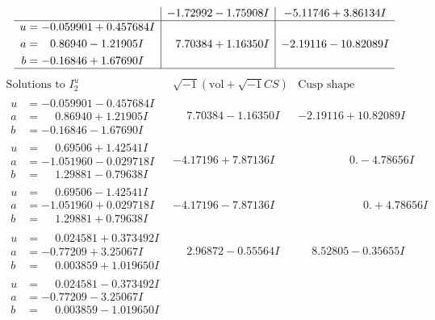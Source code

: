 \documentclass[1p]{elsarticle_modified}
\theoremstyle{definition}
\newcommand{\I}{\sqrt{-1}}
\begin{document}
$$\begin{array}{c|c|c}
 & -1.72992 - 1.75908 I & -5.11746 + 3.86134 I \\ \hline\begin{aligned}
u &= -0.059901 + 0.457684 I \\
a &= \phantom{-}0.86940 - 1.21905 I \\
b &= -0.16846 + 1.67690 I\end{aligned}
 & \phantom{-}7.70384 + 1.16350 I & -2.19116 - 10.82089 I\\
 \hline 
 \end{array}$$\newpage$$\begin{array}{c|c|c}  
\text{Solutions to }I^u_{2}& \I (\text{vol} + \sqrt{-1}CS) & \text{Cusp shape}\\
 \hline 
\begin{aligned}
u &= -0.059901 - 0.457684 I \\
a &= \phantom{-}0.86940 + 1.21905 I \\
b &= -0.16846 - 1.67690 I\end{aligned}
 & \phantom{-}7.70384 - 1.16350 I & -2.19116 + 10.82089 I \\ \hline\begin{aligned}
u &= \phantom{-}0.69506 + 1.42541 I \\
a &= -1.051960 - 0.029718 I \\
b &= \phantom{-}1.29881 - 0.79638 I\end{aligned}
 & -4.17196 + 7.87136 I & \phantom{-0.000000 } 0. - 4.78656 I \\ \hline\begin{aligned}
u &= \phantom{-}0.69506 - 1.42541 I \\
a &= -1.051960 + 0.029718 I \\
b &= \phantom{-}1.29881 + 0.79638 I\end{aligned}
 & -4.17196 - 7.87136 I & \phantom{-0.000000 -}0. + 4.78656 I \\ \hline\begin{aligned}
u &= \phantom{-}0.024581 + 0.373492 I \\
a &= -0.77209 + 3.25067 I \\
b &= \phantom{-}0.003859 + 1.019650 I\end{aligned}
 & \phantom{-}2.96872 - 0.55564 I & \phantom{-}8.52805 - 0.35655 I \\ \hline\begin{aligned}
u &= \phantom{-}0.024581 - 0.373492 I \\
a &= -0.77209 - 3.25067 I \\
b &= \phantom{-}0.003859 - 1.019650 I\end{aligned}

\end{array}$$
\end{document}
